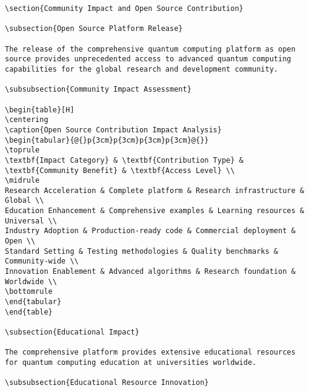 \documentclass[12pt,a4paper]{report}
\begin{document}
\begin{lstlisting}
\section{Community Impact and Open Source Contribution}

\subsection{Open Source Platform Release}

The release of the comprehensive quantum computing platform as open source provides unprecedented access to advanced quantum computing capabilities for the global research and development community.

\subsubsection{Community Impact Assessment}

\begin{table}[H]
\centering
\caption{Open Source Contribution Impact Analysis}
\begin{tabular}{@{}p{3cm}p{3cm}p{3cm}p{3cm}@{}}
\toprule
\textbf{Impact Category} & \textbf{Contribution Type} & \textbf{Community Benefit} & \textbf{Access Level} \\
\midrule
Research Acceleration & Complete platform & Research infrastructure & Global \\
Education Enhancement & Comprehensive examples & Learning resources & Universal \\
Industry Adoption & Production-ready code & Commercial deployment & Open \\
Standard Setting & Testing methodologies & Quality benchmarks & Community-wide \\
Innovation Enablement & Advanced algorithms & Research foundation & Worldwide \\
\bottomrule
\end{tabular}
\end{table}

\subsection{Educational Impact}

The comprehensive platform provides extensive educational resources for quantum computing education at universities worldwide.

\subsubsection{Educational Resource Innovation}


\end{lstlisting}
\end{document}
